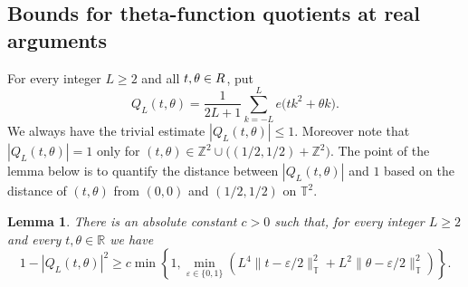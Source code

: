 \documentclass{article}
\newcommand{\Z}{\mathbb Z}
\newcommand{\R}{\mathbb R}
\newcommand{\T}{\mathbb T}
\theoremstyle{plain}
\newtheorem{lemma}[theorem]{Lemma}
\numberwithin{equation}{section}
\begin{document}
\subsection{Bounds for theta-function quotients at real arguments}
For every integer $L\geq2$ and all $t,\theta\in\mathbb \R$, put
\[
 Q_L(t,\theta)=\frac1{2L+1}\sum_{k=-L}^{L}e\big(tk^2+\theta k\big).
\]
We always have the trivial estimate $|Q_L(t,\theta)| \le 1$.
Moreover note that $|Q_L(t,\theta)|=1$ only for $(t,\theta) \in \Z^2 \cup \Big( (1/2,1/2)+ \Z^2 \Big)$. The point of the lemma below is to quantify the distance between $|Q_{L}(t,\theta)|$ and $1$ based on the distance of $(t,\theta)$ from $(0,0)$ and $(1/2,1/2)$ on $\T^2$. 
\begin{lemma}\label{lem:euclidean-quadratic-phase}
There is an absolute constant $c>0$ such that, for every integer $L\geq2$ and every
$t,\theta\in\R$ we have
\begin{equation}\label{eq:euclidean-finite-rigidity}
 1-|Q_L(t,\theta)|^2
 \geq c\min\left\{1,
 \min_{\varepsilon\in\{0,1\}}
 \left(
 L^4\|t-\varepsilon/2\|_{\T}^2
 +L^2\|\theta-\varepsilon/2\|_{\T}^2
 \right)\right\}.
\end{equation}
\end{lemma}
\end{document}
